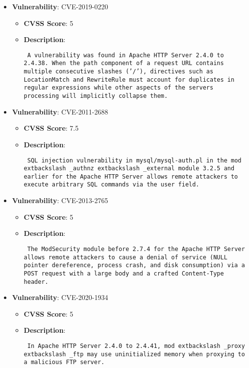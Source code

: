 \documentclass{article}
\begin{document}
\begin{itemize}
    
        \item \textbf{Vulnerability}: CVE-2019-0220
        \begin{itemize}
            \item \textbf{CVSS Score}:  5 
            \item \textbf{Description}: \parbox{\linewidth}{\texttt{ A vulnerability was found in Apache HTTP Server 2.4.0 to 2.4.38. When the path component of a request URL contains multiple consecutive slashes ('/'), directives such as LocationMatch and RewriteRule must account for duplicates in regular expressions while other aspects of the servers processing will implicitly collapse them. }}
        \end{itemize}
    
        \item \textbf{Vulnerability}: CVE-2011-2688
        \begin{itemize}
            \item \textbf{CVSS Score}:  7.5 
            \item \textbf{Description}: \parbox{\linewidth}{\texttt{ SQL injection vulnerability in mysql/mysql-auth.pl in the mod	extbackslash _authnz	extbackslash _external module 3.2.5 and earlier for the Apache HTTP Server allows remote attackers to execute arbitrary SQL commands via the user field. }}
        \end{itemize}
    
        \item \textbf{Vulnerability}: CVE-2013-2765
        \begin{itemize}
            \item \textbf{CVSS Score}:  5 
            \item \textbf{Description}: \parbox{\linewidth}{\texttt{ The ModSecurity module before 2.7.4 for the Apache HTTP Server allows remote attackers to cause a denial of service (NULL pointer dereference, process crash, and disk consumption) via a POST request with a large body and a crafted Content-Type header. }}
        \end{itemize}
    
        \item \textbf{Vulnerability}: CVE-2020-1934
        \begin{itemize}
            \item \textbf{CVSS Score}:  5 
            \item \textbf{Description}: \parbox{\linewidth}{\texttt{ In Apache HTTP Server 2.4.0 to 2.4.41, mod	extbackslash _proxy	extbackslash _ftp may use uninitialized memory when proxying to a malicious FTP server. }}
        \end{itemize}
    

\end{itemize}
\end{document}
